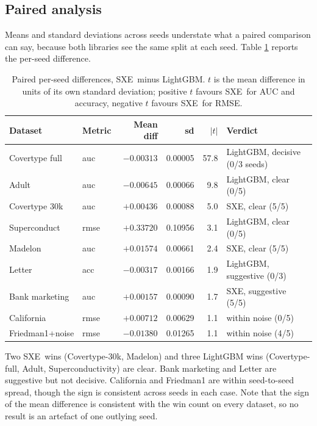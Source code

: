 \documentclass[11pt,a4paper]{article}
\newcommand{\SXE}{\textsc{SXE}}
\theoremstyle{definition}
\begin{document}
\subsection{Paired analysis}

Means and standard deviations across seeds understate what a paired comparison
can say, because both libraries see the same split at each seed. Table
\ref{tab:paired} reports the per-seed difference.

\begin{table}[h]
\centering
\small
\caption{Paired per-seed differences, \SXE\ minus LightGBM. $t$ is the mean
difference in units of its own standard deviation; positive $t$ favours \SXE\
for AUC and accuracy, negative $t$ favours \SXE\ for RMSE.}
\label{tab:paired}
\begin{tabular}{llrrrl}
\toprule
Dataset & Metric & Mean diff & sd & $|t|$ & Verdict \\
\midrule
Covertype full  & auc  & $-0.00313$ & 0.00005 & 57.8 & LightGBM, decisive (0/3 seeds) \\
Adult           & auc  & $-0.00645$ & 0.00066 & 9.8  & LightGBM, clear (0/5) \\
Covertype 30k   & auc  & $+0.00436$ & 0.00088 & 5.0  & \SXE, clear (5/5) \\
Superconduct    & rmse & $+0.33720$ & 0.10956 & 3.1  & LightGBM, clear (0/5) \\
Madelon         & auc  & $+0.01574$ & 0.00661 & 2.4  & \SXE, clear (5/5) \\
Letter          & acc  & $-0.00317$ & 0.00166 & 1.9  & LightGBM, suggestive (0/3) \\
Bank marketing  & auc  & $+0.00157$ & 0.00090 & 1.7  & \SXE, suggestive (5/5) \\
California      & rmse & $+0.00712$ & 0.00629 & 1.1  & within noise (0/5) \\
Friedman1+noise & rmse & $-0.01380$ & 0.01265 & 1.1  & within noise (4/5) \\
\bottomrule
\end{tabular}
\end{table}

Two \SXE\ wins (Covertype-30k, Madelon) and three LightGBM wins (Covertype-full,
Adult, Superconductivity) are clear. Bank marketing and Letter are suggestive
but not decisive. California and Friedman1 are within seed-to-seed spread,
though the sign is consistent across seeds in each case. Note that the sign of
the mean difference is consistent with the win count on every dataset, so no
result is an artefact of one outlying seed.
\end{document}
